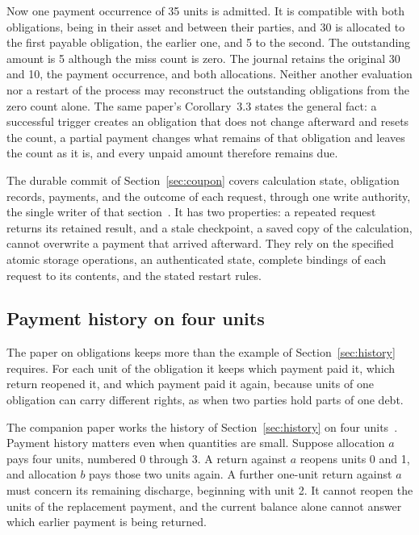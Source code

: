 \documentclass{momentum}
\begin{document}
Now one payment occurrence of 35 units is admitted. It is compatible with both obligations, being in their asset and between their parties, and 30 is allocated to the first payable obligation, the earlier one, and 5 to the second. The outstanding amount is 5 although the miss count is zero. The journal retains the original 30 and 10, the payment occurrence, and both allocations. Neither another evaluation nor a restart of the process may reconstruct the outstanding obligations from the zero count alone. The same paper's Corollary~3.3 states the general fact: a successful trigger creates an obligation that does not change afterward and resets the count, a partial payment changes what remains of that obligation and leaves the count as it is, and every unpaid amount therefore remains due.

The durable commit of Section~\ref{sec:coupon} covers calculation state, obligation records, payments, and the outcome of each request, through one write authority, the single writer of that section~\cite[Section~5.1]{claim}. It has two properties: a repeated request returns its retained result, and a stale checkpoint, a saved copy of the calculation, cannot overwrite a payment that arrived afterward. They rely on the specified atomic storage operations, an authenticated state, complete bindings of each request to its contents, and the stated restart rules.

\subsection{Payment history on four units}
\label{sec:conditions-history}

The paper on obligations keeps more than the example of Section~\ref{sec:history} requires. For each unit of the obligation it keeps which payment paid it, which return reopened it, and which payment paid it again, because units of one obligation can carry different rights, as when two parties hold parts of one debt.

The companion paper works the history of Section~\ref{sec:history} on four units~\cite[Section~7.5]{aot}. Payment history matters even when quantities are small. Suppose allocation $a$ pays four units, numbered 0 through 3. A return against $a$ reopens units 0 and 1, and allocation $b$ pays those two units again. A further one-unit return against $a$ must concern its remaining discharge, beginning with unit 2. It cannot reopen the units of the replacement payment, and the current balance alone cannot answer which earlier payment is being returned.
\end{document}
